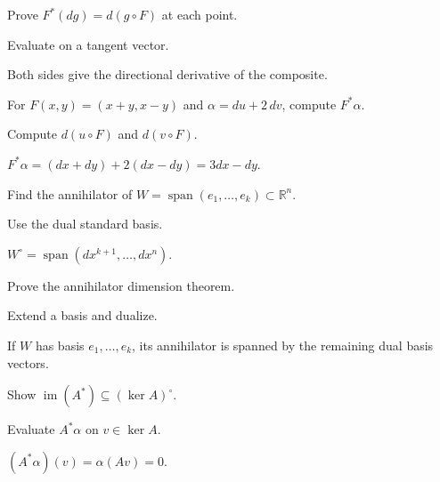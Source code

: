 \begin{exercise}\label{exr:vii05-12}
Prove \(F^*(dg)=d(g\circ F)\) at each point.
\end{exercise}
\begin{hint}
Evaluate on a tangent vector.
\end{hint}
\begin{solution}
Both sides give the directional derivative of the composite.
\end{solution}

\begin{exercise}\label{exr:vii05-13}
For \(F(x,y)=(x+y,x-y)\) and \(\alpha=du+2\,dv\), compute \(F^*\alpha\).
\end{exercise}
\begin{hint}
Compute \(d(u\circ F)\) and \(d(v\circ F)\).
\end{hint}
\begin{solution}
\(F^*\alpha=(dx+dy)+2(dx-dy)=3dx-dy\).
\end{solution}

\begin{exercise}\label{exr:vii05-14}
Find the annihilator of \(W=\operatorname{span}(e_1,\dots,e_k)\subset\mathbb R^n\).
\end{exercise}
\begin{hint}
Use the dual standard basis.
\end{hint}
\begin{solution}
\(W^\circ=\operatorname{span}(dx^{k+1},\dots,dx^n)\).
\end{solution}

\begin{exercise}\label{exr:vii05-15}
Prove the annihilator dimension theorem.
\end{exercise}
\begin{hint}
Extend a basis and dualize.
\end{hint}
\begin{solution}
If \(W\) has basis \(e_1,\dots,e_k\), its annihilator is spanned by the remaining dual basis vectors.
\end{solution}

\begin{exercise}\label{exr:vii05-16}
Show \(\operatorname{im}(A^*)\subseteq(\ker A)^\circ\).
\end{exercise}
\begin{hint}
Evaluate \(A^*\alpha\) on \(v\in\ker A\).
\end{hint}
\begin{solution}
\((A^*\alpha)(v)=\alpha(Av)=0\).
\end{solution}

